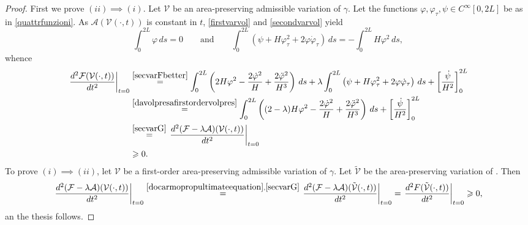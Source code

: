 \documentclass[11pt]{amsart}
\renewcommand{\geq}{\geqslant}
\newcommand{\A}{\mathcal A}
\newcommand{\F}{\mathcal F}
\theoremstyle{definition}
\theoremstyle{remark}
\numberwithin{equation}{section}
\begin{document}
\begin{proof}
First we prove $(ii)\implies (i)$. Let $\mathcal{V}$ be an area-preserving admissible variation of $\gamma$. Let the functions $\varphi,\varphi_\tau,\psi\in C^\infty[0,2L]$ be as in \eqref{quattrfunzioni}. As $\A(\mathcal V(\cdot,t))$ is constant in $t$, \eqref{firstvarvol} and \eqref{secondvarvol} yield
\begin{equation}\label{davolpresafirstordervolpres}
	\int_0^{2L}\varphi\,ds=0\qquad\text{and}\qquad \int_0^{2L}\left(\psi+H\varphi_\tau^2+2\varphi\dot\varphi_\tau\right)\,ds=-\int_0^{2L}H\varphi^2\,ds,
\end{equation}
whence
\begin{equation*}
	\begin{split}
		\left.\frac{d^2\F(\mathcal V(\cdot,t))}{dt^2}\right|_{t=0}&\overset{\eqref{secvarFbetter}}{=}\int_0^{2L}\left(2H\varphi^2-\frac{2\dot\varphi^2}{H}+\frac{2\ddot\varphi^2}{H^3}\right)\,ds+\lambda\int_0^{2L}\left(\psi+H\varphi_\tau^2+2\varphi\dot\varphi_\tau\right)\,ds+\left[\frac{\dot\psi}{H^2}\right]_{0}^{2L}\\
		&\overset{\eqref{davolpresafirstordervolpres}}{=}\int_0^{2L}\left((2-\lambda)H\varphi^2-\frac{2\dot\varphi^2}{H}+\frac{2\ddot\varphi^2}{H^3}\right)\,ds+\left[\frac{\dot\psi}{H^2}\right]_{0}^{2L}\\
		&\overset{\eqref{secvarG}}{=}\left.\frac{d^2(\F-\lambda\A)(\mathcal V(\cdot,t))}{dt^2}\right|_{t=0}\\
		&\geq 0.
	\end{split}
\end{equation*}
To prove $(i)\implies (ii)$, let $\mathcal{V}$ be a first-order area-preserving admissible variation of $\gamma$. Let $ \mathcal {\tilde V}$ be the area-preserving variation of . Then 
\begin{equation*}
	\left.\frac{d^2(\F-\lambda\A)(\mathcal V(\cdot,t))}{dt^2}\right|_{t=0}\overset{\eqref{docarmopropultimateequation},\eqref{secvarG}}{=} \left.\frac{d^2(\F-\lambda\A)(\mathcal {\tilde V}(\cdot,t))}{dt^2}\right|_{t=0}=\left.\frac{d^2F(\mathcal {\tilde V}(\cdot,t))}{dt^2}\right|_{t=0}\geq 0,
\end{equation*}
an the thesis follows.
\end{proof}
\end{document}
